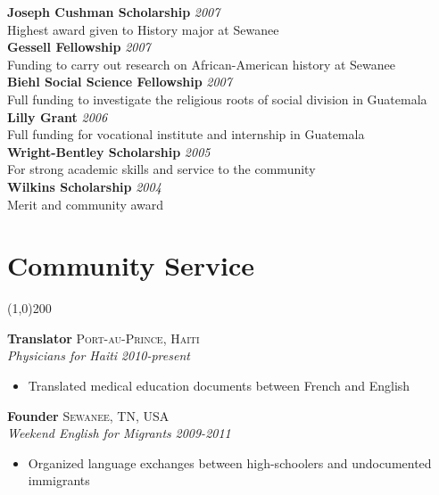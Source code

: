 \documentclass[11pt]{article}
\begin{document}
{{\noindent \textbf{Joseph Cushman Scholarship}  \hfill \emph{2007}\\
\noindent Highest award given to History major at Sewanee \\

\noindent \textbf{Gessell Fellowship}  \hfill \emph{2007}\\
\noindent Funding to carry out research on African-American history at Sewanee\\

\noindent \textbf{Biehl Social Science Fellowship}  \hfill \emph{2007}\\
\noindent Full funding to investigate the religious roots of social division in Guatemala\\

\noindent \textbf{Lilly Grant}  \hfill \emph{2006}\\
\noindent Full funding for vocational institute and internship in Guatemala\\

\noindent \textbf{Wright-Bentley Scholarship}  \hfill \emph{2005}\\
\noindent For strong academic skills and service to the community\\

\noindent \textbf{Wilkins Scholarship}  \hfill \emph{2004}\\
\noindent Merit and community award\\

\newpage

\section*{Community Service} %
\vspace{-7mm}
\line(1,0){200}
\vspace{2mm}

\noindent \textbf{Translator} \hfill \textsc{Port-au-Prince, Haiti}\\
\noindent \emph{Physicians for Haiti} \hfill \emph{2010-present}
\vspace{-2mm}
\begin{itemize}\itemsep0pt \parskip0pt 
\item Translated medical education documents between French and English
\end{itemize}

\noindent \textbf{Founder} \hfill \textsc{Sewanee, TN, USA}\\
\noindent \emph{Weekend English for Migrants} \hfill \emph{2009-2011}
\vspace{-2mm}
\begin{itemize}\itemsep0pt \parskip0pt 
\item Organized language exchanges between high-schoolers and undocumented immigrants
\end{itemize}


}}
\end{document}
